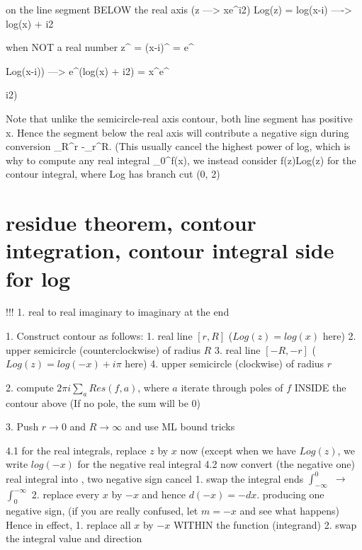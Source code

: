 	
	on the line segment BELOW the real axis (z ---> xe^{i2\pi})
		Log(z) = log(x-i\delta) ----> log(x) + i2\pi 
	
	
		when \alpha NOT a real number
		z^\alpha 
		= (x-i\delta)^\alpha
		= e^{\alpha Log(x-i\delta))		
		---> e^{\alpha (log(x) + i2\pi)}
		= x^\alpha e^{\alpha i2\pi)
	
	Note that unlike the semicircle-real axis contour, both line segment has positive x. Hence the segment below the real axis will contribute a negative sign during conversion \int_R^r \to -\int_r^R. 
		(This usually cancel the highest power of log, which is why to compute any real integral \int_0^\infty f(x), we instead consider \int f(z)Log(z) for the contour integral, where Log has branch cut (0, 2\pi)












    
\section*{residue theorem, contour integration, contour integral side for log}

    !!! 1. real to real imaginary to imaginary at the end

    1. Construct contour as follows: 
	    1. real line $[r,R]$ ($Log(z) = log(x)$ here)
        2. upper semicircle (counterclockwise) of radius $R$
        3. real line $[-R,-r]$  ($Log(z) = log(-x)+i\pi$ here)
        4. upper semicircle (clockwise) of radius $r$

    2. compute $2\pi i \sum_a Res(f,a)$, where $a$ iterate through poles of $f$ INSIDE the contour above (If no pole, the sum will be 0)

    3. Push $r \to 0$ and $R \to \infty$ and use ML bound tricks


    4.1 for the real integrals, replace $z$ by $x$ now (except when we have $Log(z)$, we write $log(-x)$ for the negative real integral
    4.2 now convert (the negative one) real integral into , two negative sign cancel
	    1. swap the integral ends $\int_{-\infty}^{0}$ $\to$ $\int_0^{-\infty}$ 
        2. replace every $x$ by $-x$ and hence $d(-x) = -dx$. producing one negative sign, (if you are really confused, let $m=-x$ and see what happens)
    Hence in effect, 
	    1. replace all $x$ by $-x$ WITHIN the function (integrand)
        2. swap the integral value and direction
    
}}
